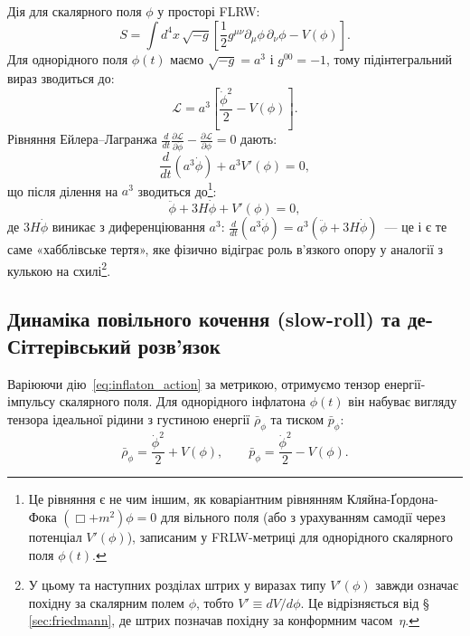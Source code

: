 \documentclass[12pt, a4paper]{article}
\begin{document}
Дія для скалярного поля $\phi$ у просторі FLRW:
\begin{equation}\label{eq:inflaton_action}
  S = \int d^4x\,\sqrt{-g}\left[\frac{1}{2}g^{\mu\nu}\partial_\mu\phi\,\partial_\nu\phi - V(\phi)\right].
\end{equation}
Для однорідного поля $\phi(t)$ маємо $\sqrt{-g} = a^3$ і $g^{00} = -1$,
тому підінтегральний вираз зводиться до:
\begin{equation*}
  \mathcal{L} = a^3\!\left[\frac{\dot{\phi}^2}{2} - V(\phi)\right].
\end{equation*}
Рівняння Ейлера--Лагранжа $\frac{d}{dt}\frac{\partial\mathcal{L}}{\partial\dot{\phi}} - \frac{\partial\mathcal{L}}{\partial\phi} = 0$ дають:
\begin{equation*}
  \frac{d}{dt}\!\left(a^3\dot{\phi}\right) + a^3 V'(\phi) = 0,
\end{equation*}
що після ділення на $a^3$ зводиться до\footnote{Це рівняння є не чим іншим, як коваріантним рівнянням Кляйна-Ґордона-Фока $\left(\Box + m^2\right)\phi = 0$ для вільного поля (або з урахуванням самодії через потенціал $V'(\phi)$), записаним у FRLW-метриці для однорідного скалярного поля $\phi(t)$.}:
\begin{equation}\label{eq:klein_gordon}
    \ddot{\phi} +3H\dot{\phi} + V'(\phi) = 0,
\end{equation}
де $3H\dot{\phi}$ виникає з диференціювання $a^3$:
$\frac{d}{dt}(a^3\dot{\phi}) = a^3(\ddot{\phi} + 3H\dot{\phi})$~---
це і є те саме «хабблівське тертя», яке фізично відіграє роль
в'язкого опору у аналогії з кулькою на схилі\footnote{У цьому та наступних розділах
штрих у виразах типу $V'(\phi)$ завжди означає похідну за
скалярним полем $\phi$, тобто $V' \equiv dV/d\phi$. Це відрізняється
від §\,\ref{sec:friedmann}, де штрих позначав похідну за конформним
часом~$\eta$.}.

\subsection{Динаміка повільного кочення (slow-roll) та де-Сіт\-те\-рів\-ський розв'язок}
\label{subsec:slowroll_dynamics}

Варіюючи дію~\eqref{eq:inflaton_action} за метрикою, отримуємо тензор енергії-імпульсу скалярного поля. Для однорідного інфлатона $\phi(t)$ він набуває вигляду тензора ідеальної рідини з густиною енергії $\bar{\rho}_\phi$ та тиском $\bar{p}_\phi$:
\begin{equation}\label{eq:inflaton_rho_p}
  \bar{\rho}_\phi = \frac{\dot{\phi}^2}{2} + V(\phi),
  \qquad
  \bar{p}_\phi   = \frac{\dot{\phi}^2}{2} - V(\phi).
\end{equation}
\end{document}

